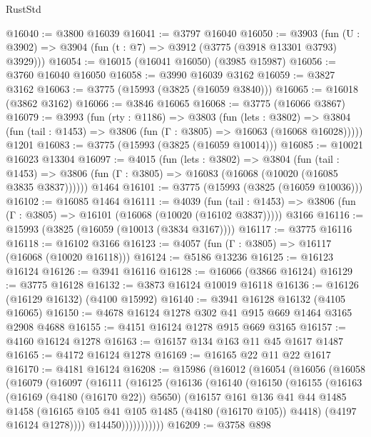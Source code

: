 \begin{lexlean}{RustStd}
\begin{coremodule}
{\begin{coremodule}
{{{{{{{{{{{{{{{{{{{{{{{{{{{{{{{@16040 := @3800 @16039
@16041 := @3797 @16040
@16050 := @3903
    (fun (U : @3902) => @3904 (fun (t : @7) => @3912 (@3775 (@3918 @13301 @3793) @3929)))
@16054 := @16015 (@16041 @16050) (@3985 @15987)
@16056 := @3760 @16040 @16050
@16058 := @3990 @16039 @3162
@16059 := @3827 @3162
@16063 := @3775 (@15993 (@3825 (@16059 @3840)))
@16065 := @16018 (@3862 @3162)
@16066 := @3846 @16065
@16068 := @3775 (@16066 @3867)
@16079 := @3993
    (fun (rty : @1186) =>
    @3803
      (fun (lets : @3802) =>
      @3804 (fun (tail : @1453) => @3806 (fun (Γ : @3805) => @16063 (@16068 @16028)))))
    @1201
@16083 := @3775 (@15993 (@3825 (@16059 @10014)))
@16085 := @10021 @16023 @13304
@16097 := @4015
    (fun (lets : @3802) =>
    @3804
      (fun (tail : @1453) =>
      @3806 (fun (Γ : @3805) => @16083 (@16068 (@10020 (@16085 @3835 @3837))))))
    @1464
@16101 := @3775 (@15993 (@3825 (@16059 @10036)))
@16102 := @16085 @1464
@16111 := @4039
    (fun (tail : @1453) => @3806 (fun (Γ : @3805) => @16101 (@16068 (@10020 (@16102 @3837)))))
    @3166
@16116 := @15993 (@3825 (@16059 (@10013 (@3834 @3167))))
@16117 := @3775 @16116
@16118 := @16102 @3166
@16123 := @4057 (fun (Γ : @3805) => @16117 (@16068 (@10020 @16118)))
@16124 := @5186 @13236
@16125 := @16123 @16124
@16126 := @3941 @16116
@16128 := @16066 (@3866 @16124)
@16129 := @3775 @16128
@16132 := @3873 @16124 @10019 @16118
@16136 := @16126 (@16129 @16132) (@4100 @15992)
@16140 := @3941 @16128 @16132 (@4105 @16065)
@16150 := @4678 @16124 @1278 @302 @41 @915 @669 @1464 @3165 @2908 @4688
@16155 := @4151 @16124 @1278 @915 @669 @3165
@16157 := @4160 @16124 @1278
@16163 := @16157 @134 @163 @11 @45 @1617 @1487
@16165 := @4172 @16124 @1278
@16169 := @16165 @22 @11 @22 @1617
@16170 := @4181 @16124
@16208 := @15986
    (@16012
      (@16054
        (@16056
          (@16058
            (@16079
              (@16097
                (@16111
                  (@16125
                    (@16136
                      (@16140
                        (@16150
                          (@16155
                            (@16163
                              (@16169 (@4180 (@16170 @22)) @5650)
                              (@16157
                                @161
                                @136
                                @41
                                @44
                                @1485
                                @1458
                                (@16165 @105 @41 @105 @1485 (@4180 (@16170 @105)) @4418)
                                (@4197 @16124 @1278))))
                          @14450)))))))))))
@16209 := @3758 @898
}}}}}}}}}}}}}}}}}}}}}}}}}}}}}}}
\end{coremodule}}
\end{coremodule}
\end{lexlean}
